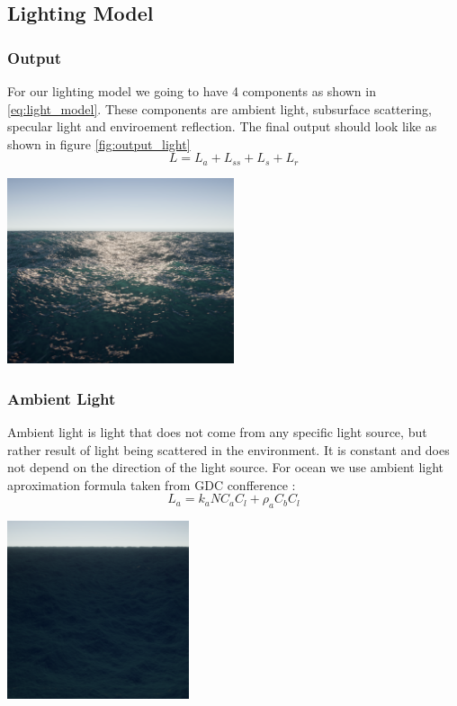 \subsection{Lighting Model}

\subsubsection{Output}
For our lighting model we going to have 4 components as shown in \ref{eq:light_model}. These components are 
ambient light, subsurface scattering, specular light and enviroement reflection. The final output should look like as shown in figure \ref{fig:output_light}
\begin{equation}
    L = L_a + L_{ss} + L_s + L_r
    \label{eq:light_model}
\end{equation}
\begin{minipage}{1\textwidth}
    \centering
    \includegraphics[width=0.50\textwidth]{"images/output_light.png"}
    \label{fig:output_light}
\end{minipage}

\subsubsection{Ambient Light}
Ambient light is light that does not come from any specific light source, but rather result of light being scattered in the environment. It is constant and does not depend on the direction of the light source.
For ocean we use  ambient light aproximation formula taken from GDC confference \cite{mark2021}:
\begin{equation}
    L_a = k_a N C_a C_l + \rho_a C_b C_l
\end{equation}
\begin{minipage}{1\textwidth}
    \centering
    \includegraphics[width=0.40\textwidth]{"images/ambient_light.png"}
    \label{fig:ambient_light}
\end{minipage}


